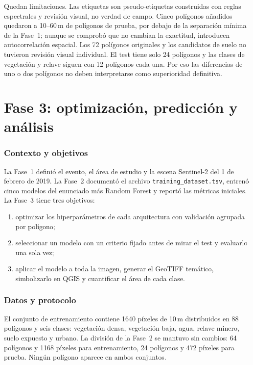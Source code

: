 \documentclass{article}
\begin{document}
Quedan limitaciones. Las etiquetas son pseudo-etiquetas construidas con reglas espectrales y revisión visual, no verdad de campo. Cinco polígonos añadidos quedaron a 10--60\,m de polígonos de prueba, por debajo de la separación mínima de la Fase~1; aunque se comprobó que no cambian la exactitud, introducen autocorrelación espacial. Los 72 polígonos originales y los candidatos de suelo no tuvieron revisión visual individual. El test tiene solo 24 polígonos y las clases de vegetación y relave siguen con 12 polígonos cada una. Por eso las diferencias de uno o dos polígonos no deben interpretarse como superioridad definitiva.

\part{Fase 3: optimización, predicción y análisis}
\label{part:fase3}

\section{Contexto y objetivos}

La Fase~1 definió el evento, el área de estudio y la escena Sentinel-2 del 1 de febrero de 2019. La Fase~2 documentó el archivo \texttt{training\_dataset.tsv}, entrenó cinco modelos del enunciado más Random Forest y reportó las métricas iniciales. La Fase~3 tiene tres objetivos:

\begin{enumerate}
 \item optimizar los hiperparámetros de cada arquitectura con validación agrupada por polígono;
 \item seleccionar un modelo con un criterio fijado antes de mirar el test y evaluarlo una sola vez;
 \item aplicar el modelo a toda la imagen, generar el GeoTIFF temático, simbolizarlo en QGIS y cuantificar el área de cada clase.
\end{enumerate}

\section{Datos y protocolo}

El conjunto de entrenamiento contiene 1640 píxeles de 10\,m distribuidos en 88 polígonos y seis clases: vegetación densa, vegetación baja, agua, relave minero, suelo expuesto y urbano. La división de la Fase~2 se mantuvo sin cambios: 64 polígonos y 1168 píxeles para entrenamiento, 24 polígonos y 472 píxeles para prueba. Ningún polígono aparece en ambos conjuntos.
\end{document}
